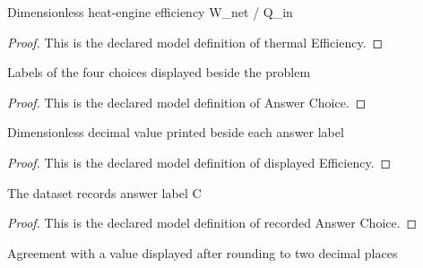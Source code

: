 \begin{definition}
  \label{def:physics:phyx-mini-0419:phyxminiproblems-problemphyxmini0419-thermalefficiency}
  Dimensionless heat-engine efficiency W\_net / Q\_in
\end{definition}
\begin{proof}
  This is the declared model definition of thermal Efficiency.
\end{proof}
\begin{definition}
  \label{def:physics:phyx-mini-0419:phyxminiproblems-problemphyxmini0419-answerchoice}
  Labels of the four choices displayed beside the problem
\end{definition}
\begin{proof}
  This is the declared model definition of Answer Choice.
\end{proof}
\begin{definition}
  \label{def:physics:phyx-mini-0419:phyxminiproblems-problemphyxmini0419-displayedefficiency}
  Dimensionless decimal value printed beside each answer label
\end{definition}
\begin{proof}
  This is the declared model definition of displayed Efficiency.
\end{proof}
\begin{definition}
  \label{def:physics:phyx-mini-0419:phyxminiproblems-problemphyxmini0419-recordedanswerchoice}
  The dataset records answer label C
\end{definition}
\begin{proof}
  This is the declared model definition of recorded Answer Choice.
\end{proof}
\begin{definition}
  \label{def:physics:phyx-mini-0419:phyxminiproblems-problemphyxmini0419-roundstodisplayedhundredth}
  Agreement with a value displayed after rounding to two decimal places
\end{definition}
